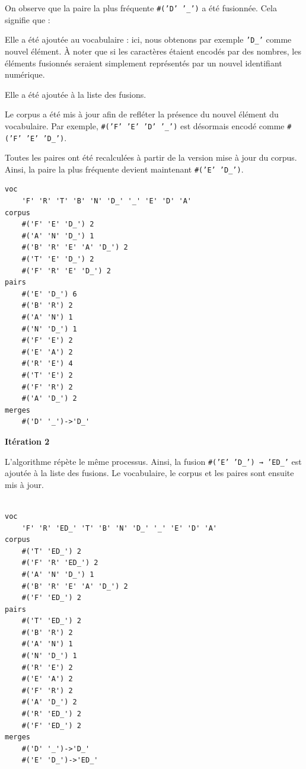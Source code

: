\documentclass[12pt,a4paper]{report}
\begin{document}
On observe que la paire la plus fréquente \texttt{\#('D'~'\_')} a été fusionnée. Cela signifie que :

\begin{itemizeFB}
	
	\item Elle a été ajoutée au vocabulaire : ici, nous obtenons par exemple \texttt{'D\_'} comme nouvel élément. À noter que si les caractères étaient encodés par des nombres, les éléments fusionnés seraient simplement représentés par un nouvel identifiant numérique.
	
	\item Elle a été ajoutée à la liste des fusions.
	
	\item Le corpus a été mis à jour afin de refléter la présence du nouvel élément du vocabulaire. Par exemple, \texttt{\#('F' 'E' 'D' '\_')} est désormais encodé comme \texttt{\#('F' 'E' 'D\_')}.
	
	\item Toutes les paires ont été recalculées à partir de la version mise à jour du corpus. Ainsi, la paire la plus fréquente devient maintenant \texttt{\#('E' 'D\_')}.
	
\end{itemizeFB}

\begin{verbatim}
voc  
	'F' 'R' 'T' 'B' 'N' 'D_' '_' 'E' 'D' 'A'
corpus  
	#('F' 'E' 'D_') 2
	#('A' 'N' 'D_') 1
	#('B' 'R' 'E' 'A' 'D_') 2
	#('T' 'E' 'D_') 2
	#('F' 'R' 'E' 'D_') 2
pairs  
	#('E' 'D_') 6
	#('B' 'R') 2
	#('A' 'N') 1
	#('N' 'D_') 1
	#('F' 'E') 2
	#('E' 'A') 2
	#('R' 'E') 4
	#('T' 'E') 2
	#('F' 'R') 2
	#('A' 'D_') 2
merges 
	#('D' '_')->'D_'	
\end{verbatim}

\textbf{Itération 2}

L’algorithme répète le même processus. Ainsi, la fusion \texttt{\#('E' 'D\_') → 'ED\_'} est ajoutée à la liste des fusions. Le vocabulaire, le corpus et les paires sont ensuite mis à jour.

\begin{verbatim}
	
voc  
	'F' 'R' 'ED_' 'T' 'B' 'N' 'D_' '_' 'E' 'D' 'A'
corpus  
	#('T' 'ED_') 2
	#('F' 'R' 'ED_') 2
	#('A' 'N' 'D_') 1
	#('B' 'R' 'E' 'A' 'D_') 2
	#('F' 'ED_') 2
pairs  
	#('T' 'ED_') 2
	#('B' 'R') 2
	#('A' 'N') 1
	#('N' 'D_') 1
	#('R' 'E') 2
	#('E' 'A') 2
	#('F' 'R') 2
	#('A' 'D_') 2
	#('R' 'ED_') 2
	#('F' 'ED_') 2
merges 
	#('D' '_')->'D_'
	#('E' 'D_')->'ED_'
\end{verbatim}
\end{document}
